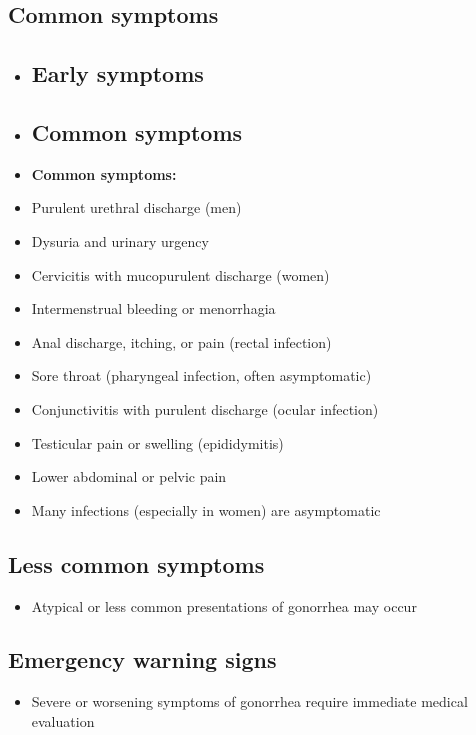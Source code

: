 \subsection{Common symptoms}
\begin{itemize}[noitemsep]
  \item \subsection{Early symptoms}
  \item \subsection{Common symptoms}
  \item \textbf{Common symptoms:}
  \item Purulent urethral discharge (men)
  \item Dysuria and urinary urgency
  \item Cervicitis with mucopurulent discharge (women)
  \item Intermenstrual bleeding or menorrhagia
  \item Anal discharge, itching, or pain (rectal infection)
  \item Sore throat (pharyngeal infection, often asymptomatic)
  \item Conjunctivitis with purulent discharge (ocular infection)
  \item Testicular pain or swelling (epididymitis)
  \item Lower abdominal or pelvic pain
  \item Many infections (especially in women) are asymptomatic
\end{itemize}

\subsection{Less common symptoms}
\begin{itemize}[noitemsep]
  \item Atypical or less common presentations of gonorrhea may occur
\end{itemize}

\subsection{Emergency warning signs}
\begin{itemize}[noitemsep]
  \item Severe or worsening symptoms of gonorrhea require immediate medical evaluation
\end{itemize}
